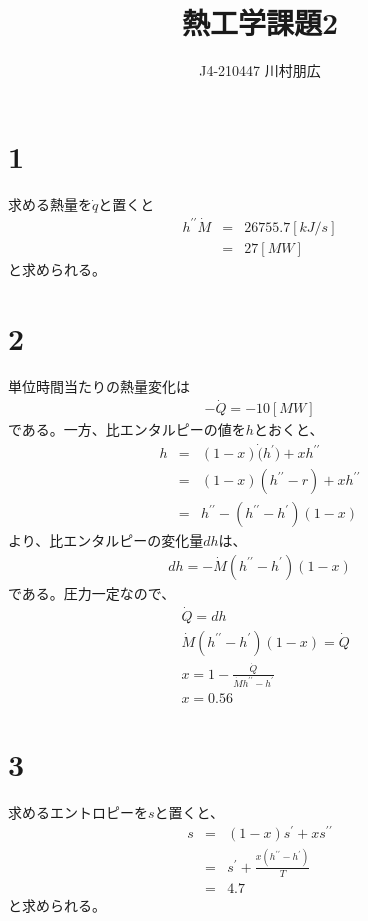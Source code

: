 \documentclass[pdflatex,ja=standard,fleqn]{bxjsarticle}
\title{熱工学課題2}
\author{J4-210447 川村朋広}
\begin{document}
\maketitle

\section*{1}
求める熱量を$\dot{q}$と置くと
\begin{eqnarray}
    h^{\prime\prime}\dot{M}&=&26755.7[kJ/s]\\&=&27[MW]
\end{eqnarray}
と求められる。
\section*{2}
単位時間当たりの熱量変化は
\begin{eqnarray*}
    -\dot{Q}=-10[MW]
\end{eqnarray*}
である。一方、比エンタルピーの値を$h$とおくと、
\begin{eqnarray}
    h&=&(1-x)\dot(h^{\prime})+xh^{\prime\prime}\\
    &=&(1-x)(h^{\prime\prime}-r)+xh^{\prime\prime}\\
    &=&h^{\prime\prime}-(h^{\prime\prime}-h^{\prime})(1-x)
\end{eqnarray}
より、比エンタルピーの変化量$dh$は、
\begin{eqnarray*}
    dh=-\dot{M}(h^{\prime\prime}-h^{\prime})(1-x)
\end{eqnarray*}
である。圧力一定なので、
\begin{align}
    &\dot{Q} = dh\\
    &\dot{M}(h^{\prime\prime}-h^{\prime})(1-x)=\dot{Q}\\
    &x=1-\frac{\dot{Q}}{\dot{M}h^{\prime\prime}-h^{\prime}}\\
    &x=0.56
\end{align}
\section*{3}
求めるエントロピーを$s$と置くと、
\begin{eqnarray}
    s&=&(1-x)s^{\prime}+xs^{\prime\prime}\\
    &=&s^{\prime}+\frac{x(h^{\prime\prime}-h^{\prime})}{T}\\
    &=&4.7
\end{eqnarray}
と求められる。
\end{document}
